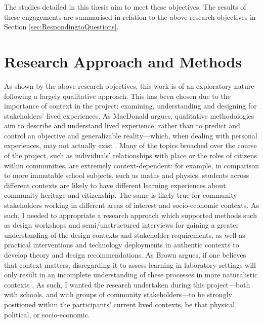 The studies detailed in this thesis aim to meet these objectives. The results of these engagements are summarised in relation to the above research objectives in Section \ref{sec:RespondingtoQuestions}.

\section{Research Approach and Methods}
\label{sec:ResearchApproach}

As shown by the above research objectives, this work is of an exploratory nature following a largely qualitative approach. This has been chosen due to the importance of context in the project: examining, understanding and designing for stakeholders' lived experiences. As MacDonald argues, qualitative methodologies aim to describe and understand lived experience, rather than to predict and control an objective and generalizable reality---which, when dealing with personal experiences, may not actually exist \citep{macdonald2012}. Many of the topics broached over the course of the project, such as individuals' relationships with place or the roles of citizens within communities, are extremely context-dependent: for example, in comparison to more immutable school subjects, such as maths and physics, students across different contexts are likely to have different learning experiences about community heritage and citizenship. The same is likely true for community stakeholders working in different areas of interest and socio-economic contexts. As such, I needed to appropriate a research approach which supported methods such as design workshops and semi/unstructured interviews for gaining a greater understanding of the design contexts and stakeholder requirements, as well as practical interventions and technology deployments in authentic contexts to develop theory and design recommendations. As Brown argues, if one believes that context matters, disregarding it to assess learning in laboratory settings will only result in an incomplete understanding of these processes in more naturalistic contexts \citep{brown1992}. As such, I wanted the research undertaken during this project---both with schools, and with groups of community stakeholders---to be strongly positioned within the participants' current lived contexts, be that physical, political, or socio-economic.

